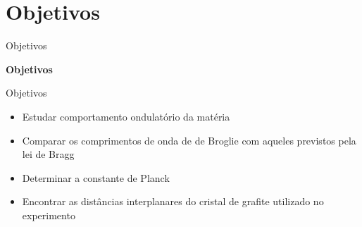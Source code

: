 \section{Objetivos}
\begin{frame}{Objetivos}
    \Huge{\centerline{\textbf{Objetivos}}}
\end{frame}

\begin{frame}{Objetivos}

\vspace{1\baselineskip}

    \begin{itemize}
        \item Estudar comportamento ondulatório da matéria
        
        \item Comparar os comprimentos de onda de de Broglie com aqueles previstos pela lei de Bragg
        
        \item Determinar a constante de Planck
        
        \item Encontrar as distâncias interplanares do cristal de grafite utilizado no experimento
    \end{itemize}
\end{frame}